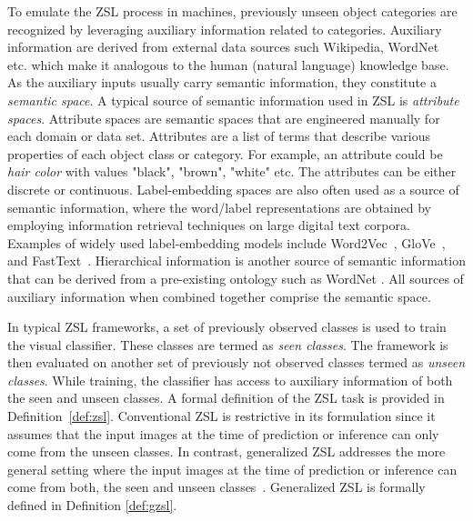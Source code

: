 \par
\medskip

To emulate the ZSL process in machines, previously unseen object categories are recognized by leveraging auxiliary information related to categories. Auxiliary information are derived from external data sources such Wikipedia, WordNet~\cite{wordnet} etc. which make it analogous to the human (natural language) knowledge base. As the auxiliary inputs usually carry semantic information, they constitute a \textit{semantic space}. A typical source of semantic information used in ZSL is \textit{attribute spaces}. Attribute spaces are semantic spaces that are engineered manually for each domain or data set. Attributes are a list of terms that describe various properties of each object class or category. For example, an attribute could be \textit{hair color} with values "black", "brown", "white" etc. The attributes can be either discrete or continuous. Label-embedding spaces are also often used as a source of semantic information, where the word/label representations are obtained by employing information retrieval techniques on large digital text corpora. Examples of widely used label-embedding models include Word2Vec~\cite{w2v}, GloVe~\cite{glove}, and FastText~\cite{fasttext}. Hierarchical information is another source of semantic information that can be derived from a pre-existing ontology such as WordNet \cite{wordnet}. All sources of auxiliary information when combined together comprise the semantic space.

\par
\medskip

In typical ZSL frameworks, a set of previously observed classes is used to train the visual classifier. These classes are termed as \textit{seen classes}. The framework is then evaluated on another set of previously not observed classes termed as \textit{unseen classes}. While training, the classifier has access to auxiliary information of both the seen and unseen classes. A formal definition of the ZSL task is provided in Definition~\ref{def:zsl}. 
Conventional ZSL is restrictive in its formulation since it assumes that the input images at the time of  prediction or inference can only come from the unseen classes. In contrast, generalized ZSL addresses the more general setting where the input images at the time of  prediction or inference can come from both, the seen and unseen classes~\cite{gen-zsl}. Generalized ZSL is formally defined in Definition \ref{def:gzsl}. 

\par
\medskip

